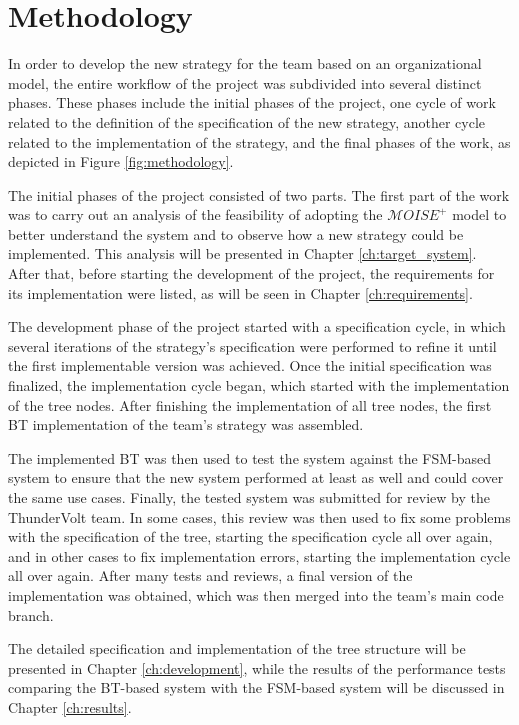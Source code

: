 \def \MOISEp {$\mathcal{M}OISE^+$ }

\chapter{Methodology}
\label{ch:methodology}

In order to develop the new strategy for the team based on an organizational model, the entire workflow of the project was subdivided into several distinct phases. These phases include the initial phases of the project, one cycle of work related to the definition of the specification of the new strategy, another cycle related to the implementation of the strategy, and the final phases of the work, as depicted in Figure \ref{fig:methodology}.

The initial phases of the project consisted of two parts. The first part of the work was to carry out an analysis of the feasibility of adopting the \MOISEp model to better understand the system and to observe how a new strategy could be implemented. This analysis will be presented in Chapter \ref{ch:target_system}. After that, before starting the development of the project, the requirements for its implementation were listed, as will be seen in Chapter \ref{ch:requirements}.

The development phase of the project started with a specification cycle, in which several iterations of the strategy's specification were performed to refine it until the first implementable version was achieved. Once the initial specification was finalized, the implementation cycle began, which started with the implementation of the tree nodes. After finishing the implementation of all tree nodes, the first BT implementation of the team's strategy was assembled.

The implemented BT was then used to test the system against the FSM-based system to ensure that the new system performed at least as well and could cover the same use cases. Finally, the tested system was submitted for review by the ThunderVolt team. In some cases, this review was then used to fix some problems with the specification of the tree, starting the specification cycle all over again, and in other cases to fix implementation errors, starting the implementation cycle all over again. After many tests and reviews, a final version of the implementation was obtained, which was then merged into the team's main code branch.

The detailed specification and implementation of the tree structure will be presented in Chapter \ref{ch:development}, while the results of the performance tests comparing the BT-based system with the FSM-based system will be discussed in Chapter \ref{ch:results}.

